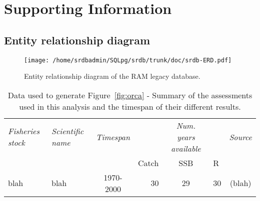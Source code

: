 \section*{Supporting Information}

\subsection*{Entity relationship diagram}
\begin{figure}
\begin{center}
\texttt{[image: /home/srdbadmin/SQLpg/srdb/trunk/doc/srdb-ERD.pdf]}
\end{center}
\caption{Entity relationship diagram of the RAM legacy database.}
\end{figure}


\begin{table}
\caption{Data used to generate Figure~\ref{fig:orca} - Summary of the assessments used in this analysis and the timespan of their different results. }
\begin{tabular}{| p{5cm} | p{3cm} | c | r  c  l | c | }\label{tab:timespan}
\textit{Fisheries stock} & \textit{Scientific name} & \textit{Timespan} & & \textit{Num. years available} & & \textit{Source} \\
 & & & Catch & SSB & R & \\
\hline \hline
blah & blah & 1970-2000 & 30 & 29 & 30 & (blah) \\
\end{tabular}
\end{table}



